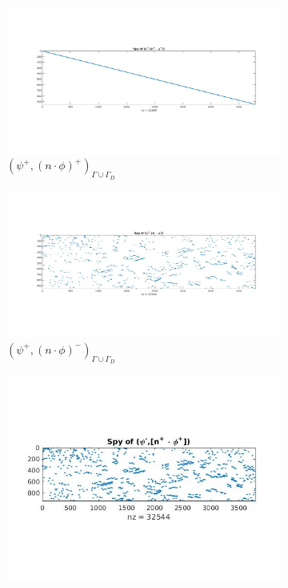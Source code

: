 \documentclass[a4paper,openany]{book}
\begin{document}
\begin{figure}
  \begin{subfigure}{0.5\textwidth}
    \includegraphics[width=\linewidth]{figure41.jpg}
  \caption{$( \psi^+ ,(n \cdot \phi)^+)_{\Gamma \cup \Gamma_D}$}
  \label{fig:figure41}
  \end{subfigure}
  \begin{subfigure}{0.5\textwidth}
    \includegraphics[width=\linewidth]{figure42.jpg}
  \caption{$( \psi^+ ,(n \cdot \phi)^-)_{\Gamma \cup \Gamma_D}$}
  \label{fig:figure42}
  \end{subfigure}
    \begin{subfigure}{0.5\textwidth}
    \includegraphics[width=\linewidth]{figure43.jpg}

\end{subfigure}
\end{figure}
\end{document}
